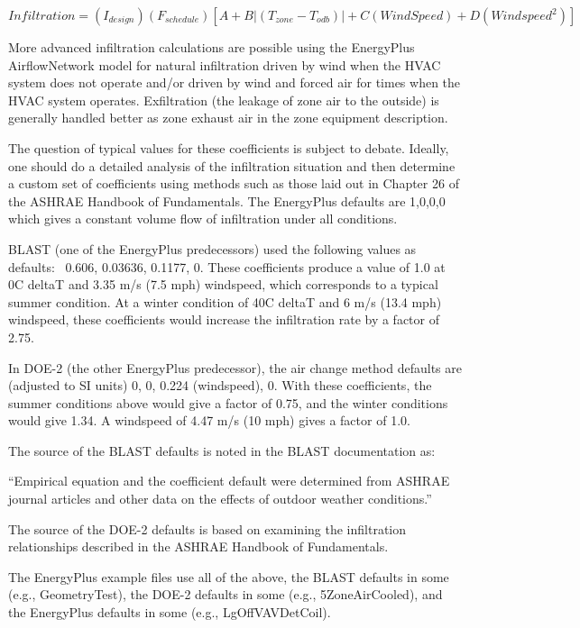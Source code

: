 \begin{equation}
Infiltration = \left( {{I_{design}}} \right)\left( {{F_{schedule}}} \right)\left[ {A + B\left| {\left( {{T_{zone}} - {T_{odb}}} \right)} \right| + C\left( {WindSpeed} \right) + D\left( {Windspee{d^2}} \right)} \right]
\end{equation}

More advanced infiltration calculations are possible using the EnergyPlus AirflowNetwork model for natural infiltration driven by wind when the HVAC system does not operate and/or driven by wind and forced air for times when the HVAC system operates. Exfiltration (the leakage of zone air to the outside) is generally handled better as zone exhaust air in the zone equipment description.

The question of typical values for these coefficients is subject to debate. Ideally, one should do a detailed analysis of the infiltration situation and then determine a custom set of coefficients using methods such as those laid out in Chapter 26 of the ASHRAE Handbook of Fundamentals. The EnergyPlus defaults are 1,0,0,0 which gives a constant volume flow of infiltration under all conditions.

BLAST (one of the EnergyPlus predecessors) used the following values as defaults:~ 0.606, 0.03636, 0.1177, 0. These coefficients produce a value of 1.0 at 0C deltaT and 3.35 m/s (7.5 mph) windspeed, which corresponds to a typical summer condition. At a winter condition of 40C deltaT and 6 m/s (13.4 mph) windspeed, these coefficients would increase the infiltration rate by a factor of 2.75.

In DOE-2 (the other EnergyPlus predecessor), the air change method defaults are (adjusted to SI units) 0, 0, 0.224 (windspeed), 0. With these coefficients, the summer conditions above would give a factor of 0.75, and the winter conditions would give 1.34. A windspeed of 4.47 m/s (10 mph) gives a factor of 1.0.

The source of the BLAST defaults is noted in the BLAST documentation as:

``Empirical equation and the coefficient default were determined from ASHRAE journal articles and other data on the effects of outdoor weather conditions.''

The source of the DOE-2 defaults is based on examining the infiltration relationships described in the ASHRAE Handbook of Fundamentals.

The EnergyPlus example files use all of the above, the BLAST defaults in some (e.g., GeometryTest), the DOE-2 defaults in some (e.g., 5ZoneAirCooled), and the EnergyPlus defaults in some (e.g., LgOffVAVDetCoil).

